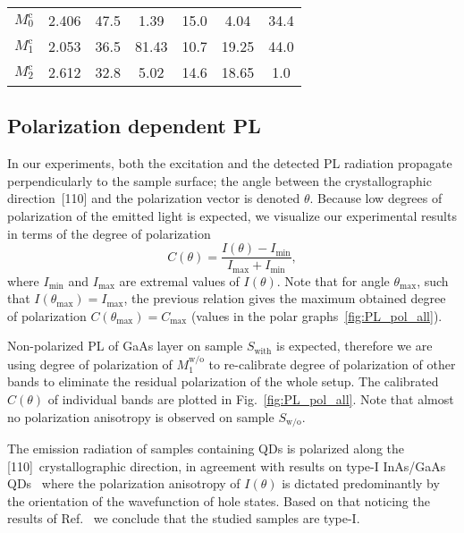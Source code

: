 \begin{table}
\begin{tabularx}{0.9\textwidth}{cCCcccc}
			\midrule
			$M_0^\mathrm{c}$& 2.406&  47.5&   1.39&   15.0 &   4.04&  34.4\\
			$M_1^\mathrm{c}$& 2.053&   36.5&   81.43&   10.7&   19.25&  44.0\\
			$M_2^\mathrm{c}$ & 2.612&   32.8&   5.02&  14.6 &  18.65 &  1.0\\
			
		\bottomrule
	\end{tabularx}\label{tab:Arhenius}
\end{table}


\clearpage
\subsection{Polarization dependent PL }
In our experiments, both the excitation and the detected PL radiation propagate perpendicularly to the sample surface; the angle between the crystallographic direction~[110] and the polarization vector is denoted $\theta$. Because low degrees of polarization of the emitted light is expected, we visualize our experimental results in terms of the degree of polarization
%
\begin{equation}
C(\theta)=\frac{I(\theta)-I_\mathrm{min}}{I_\mathrm{max}+I_\mathrm{min}},
\end{equation}
%
where $I_\mathrm{min}$ and $I_\mathrm{max}$ are extremal values of $I(\theta)$. Note that for angle $\theta_\mathrm{max}$, such that $I(\theta_\mathrm{max})=I_\mathrm{max}$, the previous relation gives the maximum obtained degree of polarization $C(\theta_\mathrm{max})=C_\mathrm{max}$ (values in the polar graphs~\ref{fig:PL_pol_all}).

Non-polarized PL of GaAs layer on sample ${S_\mathrm{with}}$ is expected, therefore we are using degree of polarization of $M_1^\mathrm{w/o}$ to re-calibrate degree of polarization of other bands to eliminate the residual polarization of the whole setup. The calibrated $C(\theta)$ of individual bands are plotted in Fig.~\ref{fig:PL_pol_all}. Note that almost no polarization anisotropy is observed on sample ${S_\mathrm{w/o}}$.

The emission radiation of samples containing QDs is polarized along the [110]~crystallographic direction, in agreement with results on type-I InAs/GaAs QDs~\citep{HumPhysE} where the polarization anisotropy of $I(\theta)$ is dictated predominantly by the orientation of the wavefunction of hole states. Based on that noticing the results of Ref.~\citep{Klenovsky2015} we conclude that the studied samples are type-I.

